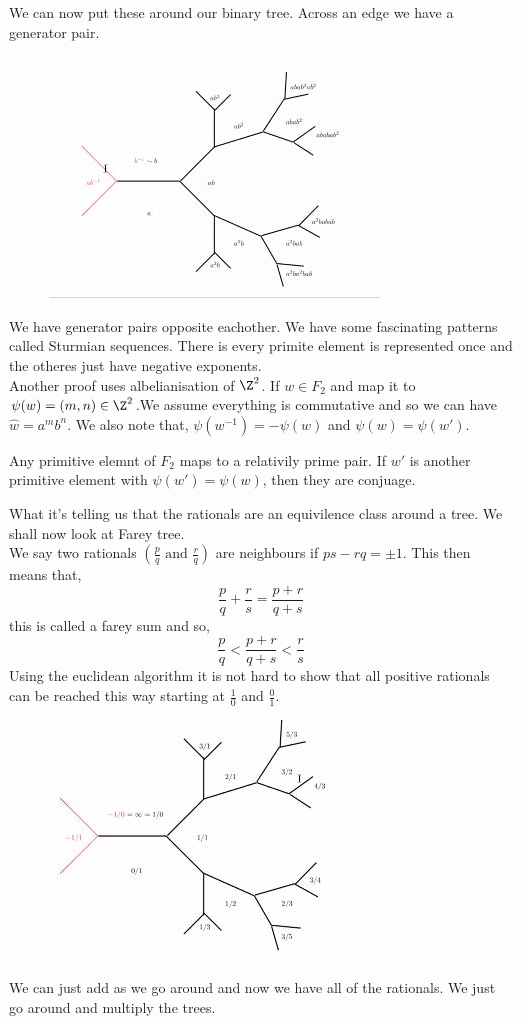 \documentclass{article}
\begin{document}
We can now put these around our binary tree. Across an edge we have a generator pair.
\begin{figure}[!ht]
  \centering
  \includegraphics{./figures/L1.4}
\end{figure}
We have generator pairs opposite eachother. We have some fascinating patterns called Sturmian sequences. There is every primite element is represented once and the otheres just have negative exponents.\\

Another proof uses albelianisation of $\Z^2$. If $w \in F_2$ and map it to $\psi (w) = (m, n) \in \Z^2$.We assume everything is commutative and so we can have $\hat w = a^mb^n$. We also note that, $\psi(w^{-1}) = -\psi(w)$ and $\psi(w) = \psi(w')$.\\

\begin{nthm}
  Any primitive elemnt of $F_2$ maps to a relativily prime pair. If $w'$ is another primitive element with $\psi(w') = \psi(w)$, then they are conjuage.
\end{nthm}

What it's telling us that the rationals are an equivilence class around a tree. We shall now look at Farey tree. \\

We say two rationals $\left(\frac{p}{q} \text{ and } \frac{r}{q}\right)$ are neighbours if $ps - rq = \pm 1$. This then means that,
$$ \frac{p}{q} + \frac{r}{s} = \frac{p+r}{q+s} $$
this is called a farey sum and so,
$$ \frac{p}{q} < \frac{p + r}{q + s} < \frac{r}{s} $$
Using the euclidean algorithm it is not hard to show that all positive rationals can be reached this way starting at $\frac{1}{0}$ and $\frac{0}{1}$.
\begin{figure}[!ht]
  \centering
  \includegraphics{./figures/L1.5}
\end{figure}
We can just add as we go around and now we have all of the rationals.
We just go around and multiply the trees.\\
\end{document}
